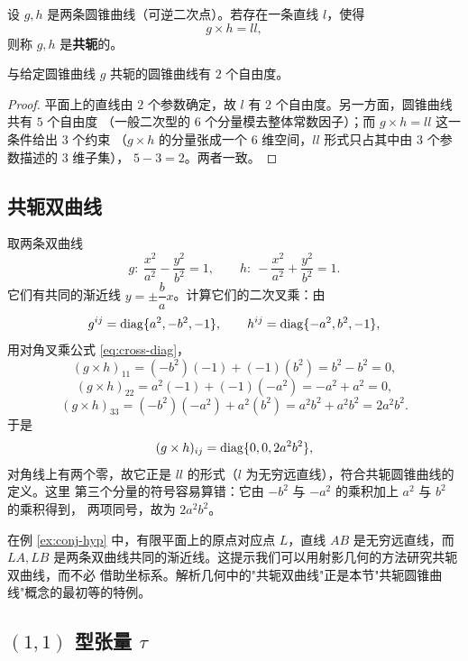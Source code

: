 \begin{definition}[共轭圆锥曲线]
\label{def:conjugate}
设 $g,h$ 是两条圆锥曲线（可逆二次点）。若存在一条直线 $l$，使得
\[
g\times h=ll,
\]
则称 $g,h$ 是\textbf{共轭}的。
\end{definition}

\begin{proposition}[自由度计数]
与给定圆锥曲线 $g$ 共轭的圆锥曲线有 $2$ 个自由度。
\end{proposition}

\begin{proof}
平面上的直线由 $2$ 个参数确定，故 $l$ 有 $2$ 个自由度。另一方面，圆锥曲线共有 $5$ 个自由度
（一般二次型的 $6$ 个分量模去整体常数因子）；而 $g\times h=ll$ 这一条件给出 $3$ 个约束
（$g\times h$ 的分量张成一个 $6$ 维空间，$ll$ 形式只占其中由 $3$ 个参数描述的 $3$ 维子集），
$5-3=2$。两者一致。
\end{proof}

\subsection{共轭双曲线}

\begin{example}[共轭双曲线]
\label{ex:conj-hyp}
取两条双曲线
\[
g:\ \frac{x^2}{a^2}-\frac{y^2}{b^2}=1,\qquad
h:\ -\frac{x^2}{a^2}+\frac{y^2}{b^2}=1 .
\]
它们有共同的渐近线 $y=\pm\dfrac ba x$。计算它们的二次叉乘：由
\[
g^{ij}=\operatorname{diag}\{a^2,-b^2,-1\},\qquad h^{ij}=\operatorname{diag}\{-a^2,b^2,-1\},
\]
用对角叉乘公式 \eqref{eq:cross-diag}，
\[
(g\times h)_{11}=(-b^2)(-1)+(-1)(b^2)=b^2-b^2=0,
\]
\[
(g\times h)_{22}=a^2(-1)+(-1)(-a^2)=-a^2+a^2=0,
\]
\[
(g\times h)_{33}=(-b^2)(-a^2)+a^2(b^2)=a^2b^2+a^2b^2=2a^2b^2 .
\]
于是
\[
(g\times h)_{ij}=\operatorname{diag}\{0,0,2a^2b^2\},
\]
对角线上有两个零，故它正是 $ll$ 的形式（$l$ 为无穷远直线），符合共轭圆锥曲线的定义。这里
第三个分量的符号容易算错：它由 $-b^2$ 与 $-a^2$ 的乘积加上 $a^2$ 与 $b^2$ 的乘积得到，
两项同号，故为 $2a^2b^2$。
\end{example}

\begin{remark}
在例 \ref{ex:conj-hyp} 中，有限平面上的原点对应点 $L$，直线 $AB$ 是无穷远直线，而
$LA,LB$ 是两条双曲线共同的渐近线。这提示我们可以用射影几何的方法研究共轭双曲线，而不必
借助坐标系。解析几何中的"共轭双曲线"正是本节"共轭圆锥曲线"概念的最初等的特例。
\end{remark}

\subsection{$(1,1)$ 型张量 $\tau$}

